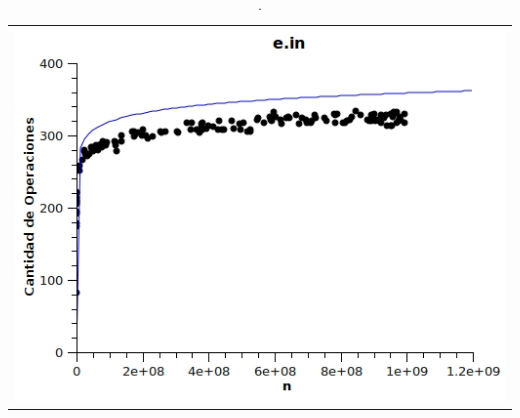 	\begin{table}[ht]
		\centering 
			\begin{tabular}{c}
				\includegraphics[scale = 0.8]{./../ej1/tests/e.jpg}
			\end{tabular}
			\caption{.} 
	\end{table}


